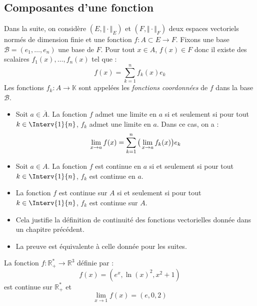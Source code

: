 \documentclass[a4paper,10pt]{report}
\begin{document}
\subsection{Composantes d'une fonction}

Dans la suite, on considère $(E, \Vert \cdot \Vert_E)$ et $(F, \Vert \cdot \Vert_F)$ deux espaces vectoriels normés de dimension finie et une fonction $f : A \subset E \rightarrow F$. Fixons une base $\mathcal{B}=(e_1, \ldots, e_n)$ une base de $F$. Pour tout $x \in A$, $f(x) \in F$ donc il existe des scalaires $f_1(x), \ldots, f_n(x)$ tel que :
 $$ f(x) = \sum_{k=1}^n f_k(x) e_k$$
Les fonctions $f_k : A \rightarrow \mathbb{K}$ sont appelées les \emph{fonctions coordonnées} de $f$ dans la base $\mathcal{B}$.

\begin{Proposition}{} 

\begin{itemize}
\item Soit $a \in \overline{A}$. La fonction $f$ admet une limite en $a$ si et seulement si pour tout $k \in\Interv{1}{n}$, $f_k$ admet une limite en $a$. Dans ce cas, on a :
$$ \lim_{x \rightarrow a} f(x) =  \sum_{k=1}^n \big{(} \lim_{x \rightarrow a} f_k(x) \big{)} e_k$$
\item Soit $a \in A$. La fonction $f$ est continue en $a$ si et seulement si pour tout $k \in\Interv{1}{n}$, $f_k$ est continue en $a$.
\item La fonction $f$ est continue sur $A$ si et seulement si pour tout $k \in\Interv{1}{n}$, $f_k$ est continue sur $A$.
\end{itemize}
\end{Proposition}

\begin{Remarques}{}
\begin{itemize}
\item Cela justifie la définition de continuité des fonctions vectorielles donnée dans un chapitre précédent.
\item La preuve est équivalente à celle donnée pour les suites.
\end{itemize}
\end{Remarques}{}

\medskip

\begin{Exemple} La fonction $f : \mathbb{R}_+^* \rightarrow \mathbb{R}^3$ définie par :
$$ f(x) = (e^x, \ln(x)^2, x^2+1)$$
est continue sur $\mathbb{R}_+^*$ et 
$$ \lim_{x \rightarrow 1} f(x) = (e,0,2)$$
\end{Exemple}
%
%
\end{document}
